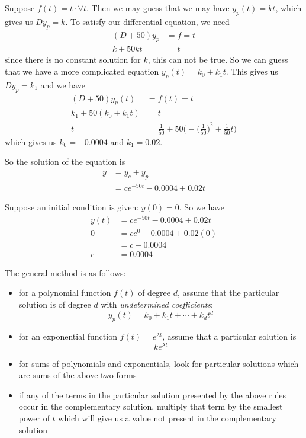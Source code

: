 \documentclass[12pt]{article}
\begin{document}
\begin{example}
Suppose $f(t) = t \cdot \forall t$. Then we may guess that we may have $y_p (t) = k t$, which gives us $Dy_p = k$. To satisfy our differential equation, we need
\begin{align*}
(D + 50)y_p &= f = t\\
k + 50kt &= t
\end{align*}
since there is no constant solution for $k$, this can not be true. So we can guess that we have a more complicated equation $y_p (t) = k_0 + k_1 t$. This gives us $Dy_p = k_1$ and we have
\begin{align*}
(D + 50)y_p (t) &= f(t) = t\\
k_1 + 50(k_0 + k_1 t) &= t\\
t &= \frac{1}{50} + 50\bigg(-{\bigg(\frac{1}{50}\bigg)}^2 + \frac{1}{50}t\bigg)
\end{align*}
which gives us $k_0 = -0.0004$ and $k_1 = 0.02$.

So the solution of the equation is
\begin{align*}
y &= y_c + y_p\\
&= ce^{-50t} - 0.0004 + 0.02t
\end{align*}

Suppose an initial condition is given: $y(0) = 0$. So we have
\begin{align*}
y(t) &= ce^{-50t} - 0.0004 + 0.02t\\
0 &= ce^0 - 0.0004 + 0.02(0)\\
&= c - 0.0004\\
c &= 0.0004
\end{align*}
\end{example}

The general method is as follows:
\begin{itemize}
\item for a polynomial function $f(t)$ of degree $d$, assume that the particular solution is of degree $d$ with \emph{undetermined coefficients}: \[ y_p(t) = k_0 + k_1t + \cdots + k_d t^d \]
\item for an exponential function $f(t) = e^{\lambda t}$, assume that a particular solution is \[ ke^{\lambda t} \]
\item for sums of polynomials and exponentials, look for particular solutions which are sums of the above two forms
\item if any of the terms in the particular solution presented by the above rules occur in the complementary solution, multiply that term by the smallest power of $t$ which will give us a value not present in the complementary solution
\end{itemize}
\end{document}
